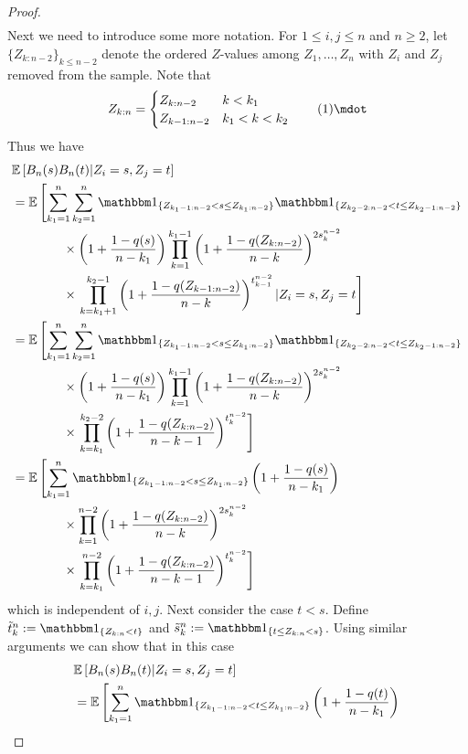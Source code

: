 \begin{lemma}
\begin{proof}
\begin{align*}
		\end{align*}
		Next we need to introduce some more notation. For $1\leq i,j\leq n$ and $n\geq 2$, let $\{Z_{k:n-2}\}_{k\leq n-2}$ denote the ordered $Z$-values among $Z_1,\dots, Z_n$ with $Z_i$ and $Z_j$ removed from the sample. Note that
		\[ Z_{k:n} = \begin{cases} 
			Z_{k:n-2} & k < k_1  \\
			Z_{k-1:n-2} & k_1 < k < k_2
		\end{cases}\numberthis\label{eq:zkn_zknminustwo}\mdot
		\]	
		Thus we have
		\begin{align*}
			&\E\left[B_n(s)B_n(t)|Z_i=s, Z_j=t\right]\\
			&= \E\left[\sum_{k_1=1}^{n} \sum_{k_2=1}^{n} \I{Z_{k_1-1:n-2} < s \leq Z_{k_1:n-2}} \I{Z_{k_2-2:n-2} < t \leq Z_{k_2-1:n-2}}\right.\\ 
			&\qquad\qquad \times \left(1+\frac{1-q(s)}{n-k_1}\right)\prod_{k=1}^{k_1-1}\left(1+\frac{1-q(Z_{k:n-2})}{n-k}\right)^{2s_k^{n-2}} \\
			&\qquad\qquad \times \left. \prod_{k=k_1+1}^{k_2-1}\left(1+\frac{1-q(Z_{k-1:n-2})}{n-k}\right)^{t_{k-1}^{n-2}} | Z_i=s, Z_j=t\right]\\
			&= \E\left[\sum_{k_1=1}^{n} \sum_{k_2=1}^{n} \I{Z_{k_1-1:n-2} < s \leq Z_{k_1:n-2}} \I{Z_{k_2-2:n-2} < t \leq Z_{k_2-1:n-2}}\right.\\ 
			&\qquad\qquad \times \left(1+\frac{1-q(s)}{n-k_1}\right)\prod_{k=1}^{k_1-1}\left(1+\frac{1-q(Z_{k:n-2})}{n-k}\right)^{2s_k^{n-2}} \\
			&\qquad\qquad \times \left. \prod_{k=k_1}^{k_2-2}\left(1+\frac{1-q(Z_{k:n-2})}{n-k-1}\right)^{t_{k}^{n-2}}\right]\\
			&= \E\left[\sum_{k_1=1}^{n} \I{Z_{k_1-1:n-2} < s \leq Z_{k_1:n-2}} \left(1+\frac{1-q(s)}{n-k_1}\right) \right.\\ 
			&\qquad\qquad \times \prod_{k=1}^{n-2}\left(1+\frac{1-q(Z_{k:n-2})}{n-k}\right)^{2s_k^{n-2}} \\
			&\qquad\qquad \times \left. \prod_{k=k_1}^{n-2}\left(1+\frac{1-q(Z_{k:n-2})}{n-k-1}\right)^{t_{k}^{n-2}}\right]
		\end{align*}		
		which is independent of $i,j$. Next consider the case $t<s$. Define $\tilde{t}_k^n := \I{Z_{k:n} < t}$ and $\tilde{s}_k^n := \I{t\leq Z_{k:n} < s}$. Using similar arguments we can show that in this case 
		\begin{align*}
			&\E\left[B_n(s)B_n(t)|Z_i=s, Z_j=t\right]\\
			&= \E\left[\sum_{k_1=1}^{n} \I{Z_{k_1-1:n-2} < t \leq Z_{k_1:n-2}} \left(1+\frac{1-q(t)}{n-k_1}\right) \right.\\ 

\end{align*}
\end{proof}
\end{lemma}

